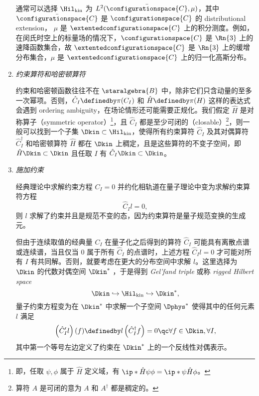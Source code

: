 \begin{enumerate}
						通常可以选择 $\Hil_{\text{kin}}$ 为 $L^2(\bar{\configurationspace{C}},\mu)$，其中 $\bar{\configurationspace{C}}$ 是 $\configurationspace{C}$ 的 distributional extension， $\mu$ 是 $\extentedconfigurationspace{C}$ 上的积分测度。例如，在闵氏时空上的标量场的情况下，$\configurationspace{C}$ 是 $\Rn{3}$ 上的速降函数集合，故 $\extentedconfigurationspace{C}$ 是 $\Rn{3}$ 上的缓增分布集合，$\mu$ 是 $\extentedconfigurationspace{C}$ 上的归一化高斯分布。

				\item \emph{约束算符和哈密顿算符}
		
						约束和哈密顿函数往往不在 $\staralgebra{B}$ 中，除非它们只含动量的至多一次幂项。否则，$\hat{C}_I \definedby \pi(C_I)$ 和 $\hat{H} \definedby \pi(H)$ 这样的表达式会遇到 ordering ambiguity，在场论情形还可能需要正规化。我们假定 $\hat{H}$ 是对称算子（symmetric operator）\footnote{即，任取 $\psi,\phi$ 属于 $\hat{H}$ 定义域，有 $\ip*{\hat{H}\psi}{\phi} = \ip*{\psi}{\hat{H} \phi}$。}，且 $\hat{C}_I$ 都是至少可闭的（closable）\footnote{算符 $A$ 是可闭的意为 $A$ 和 $A^\dagger$ 都是稠定的。}，则一般可以找到一个子集 $\Dkin \subset \Hil_{\text{kin}}$，使得所有约束算符 $\hat{C}_I$ 及其对偶算符 $\hat{C}_I^\dagger$ 和哈密顿算符 $\hat{H}$ 都在 $\Dkin$ 上稠定，且是这些算符的不变子空间，即 $\hat{H} \Dkin \subset \Dkin$ 且任取 $I$ 有 $\hat{C}_I \Dkin \subset \Dkin$。

				\item \emph{施加约束}
		
						经典理论中求解约束方程 $C_I=0$ 并约化相轨道在量子理论中变为求解约束算符方程 
						\begin{equation}
							\hat{C}_I l =0,
						\end{equation}
						则 $l$ 求解了约束并且是规范不变的态，因为约束算符是量子规范变换的生成元。

						但由于连续取值的经典量 $C_I$ 在量子化之后得到的算符 $\hat{C}_I$ 可能具有离散点谱或连续谱，当且仅当 $0$ 属于所有 $\hat{C}_I$ 的点谱时，上述方程 $\hat{C}_I l =0$ 才可能对所有 $I$ 有共同解。否则，就要考虑在更大的分布空间中求解 $l$。这里选择为 $\Dkin$ 的代数对偶空间 $\Dkin^*$ ，于是得到 \emph{Gel'fand triple} 或称 \emph{rigged Hilbert space}
						\begin{equation}
							\Dkin \hookrightarrow \Hil_{\text{kin}} \hookrightarrow \Dkin^*,
						\end{equation}
						量子约束方程变为在 $\Dkin^*$ 中求解一个子空间 $\Dphys^*$ 使得其中的任何元素 $l$ 满足
						\begin{equation}
							\left( \hat{C}_I^\prime l \right)(f) \definedby l \left( \hat{C}_I^\dagger f \right) = 0 \qc \forall f \in \Dkin, \forall I,
						\end{equation}
						其中第一个等号左边定义了约束在 $\Dkin^*$ 上的一个反线性对偶表示。


\end{enumerate}
